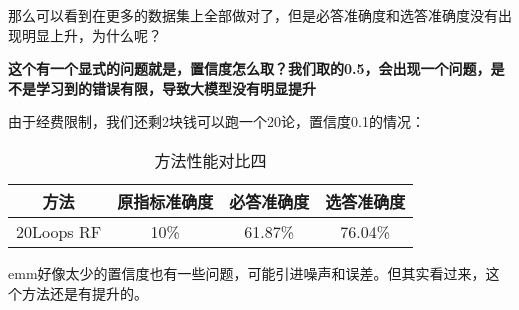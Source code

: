 \documentclass[answers]{exam}  %
\begin{document}
那么可以看到在更多的数据集上全部做对了，但是必答准确度和选答准确度没有出现明显上升，为什么呢？

\textbf{这个有一个显式的问题就是，置信度怎么取？我们取的0.5，会出现一个问题，是不是学习到的错误有限，导致大模型没有明显提升}

由于经费限制，我们还剩2块钱可以跑一个20论，置信度0.1的情况：

\begin{table}[h]
    \centering
    \begin{tabular}{cccc}
    \toprule
    \textbf{方法} & \textbf{原指标准确度} & \textbf{必答准确度} &\textbf{选答准确度}\\
    \midrule
    20Loops RF & 10\% & 61.87\% & 76.04\% \\
    \bottomrule
    \end{tabular}
    \caption{方法性能对比四}
\end{table}

emm好像太少的置信度也有一些问题，可能引进噪声和误差。但其实看过来，这个方法还是有提升的。
\end{document}
